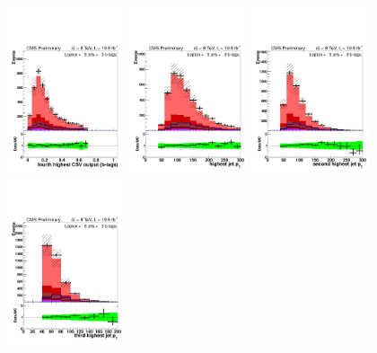\begin{figure}[hbtp]
\begin{center}
   \includegraphics[width=0.31\textwidth]{Figures/Analysis_2_Diagrams/LJ_plots_lep/5j3t/lep_jet_csv_4_5j3t_cumulative_wRatio_noLegend_lin.pdf}
   \includegraphics[width=0.31\textwidth]{Figures/Analysis_2_Diagrams/LJ_plots_lep/5j3t/lep_jet_pt_1_5j3t_cumulative_wRatio_noLegend_lin.pdf}
   \includegraphics[width=0.31\textwidth]{Figures/Analysis_2_Diagrams/LJ_plots_lep/5j3t/lep_jet_pt_2_5j3t_cumulative_wRatio_noLegend_lin.pdf}
   \includegraphics[width=0.31\textwidth]{Figures/Analysis_2_Diagrams/LJ_plots_lep/5j3t/lep_jet_pt_3_5j3t_cumulative_wRatio_noLegend_lin.pdf}

\end{center}
\end{figure}
